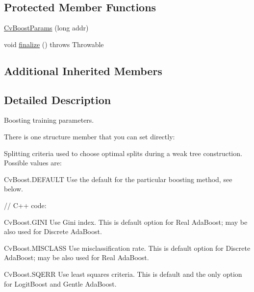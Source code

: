 \subsection*{Protected Member Functions}
\begin{DoxyCompactItemize}
\item 
\mbox{\hyperlink{classorg_1_1opencv_1_1ml_1_1_cv_boost_params_a69e879fc74d8c1305346387574de1f91}{Cv\+Boost\+Params}} (long addr)
\item 
void \mbox{\hyperlink{classorg_1_1opencv_1_1ml_1_1_cv_boost_params_a93fe028fb7e0923faf605ee8c0ed084b}{finalize}} ()  throws Throwable 
\end{DoxyCompactItemize}
\subsection*{Additional Inherited Members}


\subsection{Detailed Description}
Boosting training parameters.

There is one structure member that you can set directly\+:

Splitting criteria used to choose optimal splits during a weak tree construction. Possible values are\+:


\begin{DoxyItemize}
\item Cv\+Boost.\+D\+E\+F\+A\+U\+LT Use the default for the particular boosting method, see below. 
\end{DoxyItemize}

{\ttfamily }

{\ttfamily }

{\ttfamily }

{\ttfamily // C++ code\+:}

{\ttfamily  
\begin{DoxyItemize}
\item Cv\+Boost.\+G\+I\+NI Use Gini index. This is default option for Real Ada\+Boost; may be also used for Discrete Ada\+Boost. 
\item Cv\+Boost.\+M\+I\+S\+C\+L\+A\+SS Use misclassification rate. This is default option for Discrete Ada\+Boost; may be also used for Real Ada\+Boost. 
\item Cv\+Boost.\+S\+Q\+E\+RR Use least squares criteria. This is default and the only option for Logit\+Boost and Gentle Ada\+Boost. 
\end{DoxyItemize}}

